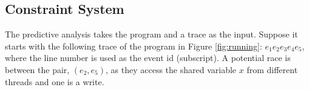




\subsection{Constraint System}
The predictive analysis takes the program and a trace as the input.  Suppose it starts with the following trace of the program in  Figure \ref{fig:running}:  $e_1 e_2 e_3 e_4 e_5$, where the line number is used as the event id (subscript). A potential race is between the pair, $(e_2, e_5)$, as they access the shared variable $x$ from different threads and one is a write. 

